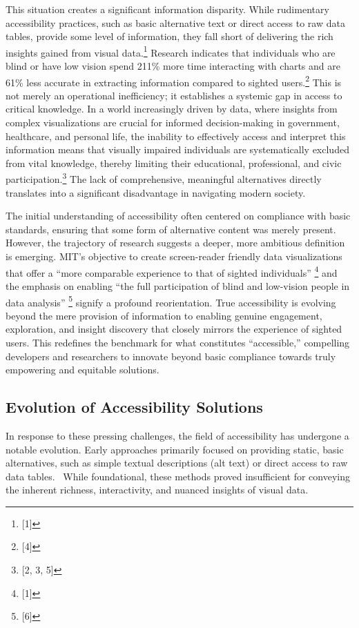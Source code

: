 This situation creates a significant information disparity. While rudimentary accessibility practices, such as basic alternative text or direct access to raw data tables, provide some level of information, they fall short of delivering the rich insights gained from visual data.\footnote{[1]} Research indicates that individuals who are blind or have low vision spend 211\% more time interacting with charts and are 61\% less accurate in extracting information compared to sighted users.\footnote{[4]} This is not merely an operational inefficiency; it establishes a systemic gap in access to critical knowledge. In a world increasingly driven by data, where insights from complex visualizations are crucial for informed decision-making in government, healthcare, and personal life, the inability to effectively access and interpret this information means that visually impaired individuals are systematically excluded from vital knowledge, thereby limiting their educational, professional, and civic participation.\footnote{[2, 3, 5]} The lack of comprehensive, meaningful alternatives directly translates into a significant disadvantage in navigating modern society.

The initial understanding of accessibility often centered on compliance with basic standards, ensuring that some form of alternative content was merely present. However, the trajectory of research suggests a deeper, more ambitious definition is emerging. MIT's objective to create screen-reader friendly data visualizations that offer a ``more comparable experience to that of sighted individuals'' \footnote{[1]} and the emphasis on enabling ``the full participation of blind and low-vision people in data analysis'' \footnote{[6]} signify a profound reorientation. True accessibility is evolving beyond the mere provision of information to enabling genuine engagement, exploration, and insight discovery that closely mirrors the experience of sighted users. This redefines the benchmark for what constitutes ``accessible,'' compelling developers and researchers to innovate beyond basic compliance towards truly empowering and equitable solutions.

\subsection{Evolution of Accessibility Solutions}
In response to these pressing challenges, the field of accessibility has undergone a notable evolution. Early approaches primarily focused on providing static, basic alternatives, such as simple textual descriptions (alt text) or direct access to raw data tables.~\cite{EvolutionOfAccessibilitySolutions} While foundational, these methods proved insufficient for conveying the inherent richness, interactivity, and nuanced insights of visual data.


